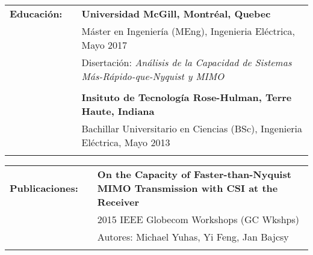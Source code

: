 \documentclass{minimal}
\begin{document}
\begin{tabular}{ p{1.5cm} p{1cm} p{16cm} }
\textbf{Educación:} & & \textbf{Universidad McGill, Montréal, Quebec} \\
& & Máster en Ingeniería (MEng), Ingenieria Eléctrica, Mayo 2017\\
& & Disertación: \textit{Análisis de la Capacidad de Sistemas Más-Rápido-que-Nyquist y MIMO}\\
& & \\
& & \textbf{Insituto de Tecnología Rose-Hulman, Terre Haute, Indiana} \\
& & Bachillar Universitario en Ciencias (BSc), Ingenieria Eléctrica, Mayo 2013\\
& & \\
\end{tabular}

\begin{tabular}{ p{1.5cm} p{1cm} p{16cm} }
\textbf{Publicaciones:} & & \textbf{On the Capacity of Faster-than-Nyquist MIMO Transmission with CSI at the Receiver}\\
& & 2015 IEEE Globecom Workshops (GC Wkshps)\\
& & Autores: Michael Yuhas, Yi Feng, Jan Bajcsy\\
& & \\
\end{tabular}
\end{document}
